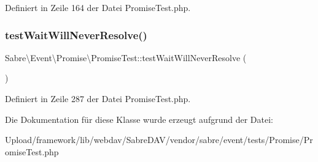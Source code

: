 Definiert in Zeile 164 der Datei Promise\+Test.\+php.

\mbox{\label{class_sabre_1_1_event_1_1_promise_1_1_promise_test_afd0b6e47658805e27fe9023308e70300}} 
\subsubsection{\texorpdfstring{test\+Wait\+Will\+Never\+Resolve()}{testWaitWillNeverResolve()}}
{\footnotesize\ttfamily Sabre\textbackslash{}\+Event\textbackslash{}\+Promise\textbackslash{}\+Promise\+Test\+::test\+Wait\+Will\+Never\+Resolve (\begin{DoxyParamCaption}{ }\end{DoxyParamCaption})}



Definiert in Zeile 287 der Datei Promise\+Test.\+php.



Die Dokumentation für diese Klasse wurde erzeugt aufgrund der Datei\+:\begin{DoxyCompactItemize}
\item 
Upload/framework/lib/webdav/\+Sabre\+D\+A\+V/vendor/sabre/event/tests/\+Promise/Promise\+Test.\+php\end{DoxyCompactItemize}
